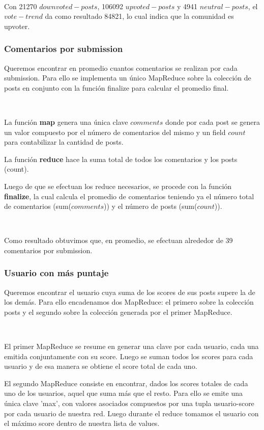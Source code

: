 ~

Con 21270 $downvoted-posts$, 106092 $upvoted-posts$ y 4941 $neutral-posts$, el $vote-trend$ da como resultado 84821, lo cual indica que la comunidad es upvoter.

\subsubsection{Comentarios por submission}

Queremos encontrar en promedio cuantos comentarios se realizan por cada submission. Para ello se implementa un único MapReduce sobre la colección de posts en conjunto con la función finalize para calcular el promedio final.

~

La función \textbf{map} genera una única clave $comments$ donde por cada post se genera un valor compuesto por el número de comentarios del mismo y un field $count$ para contabilizar la cantidad de posts.


La función \textbf{reduce} hace la suma total de todos los comentarios y los posts (count).


Luego de que se efectuan los reduce necesarios, se procede con la función \textbf{finalize}, la cual calcula el promedio de comentarios teniendo ya el número total de comentarios (sum($comments$)) y el número de posts (sum($count$)).

~

Como resultado obtuvimos que, en promedio, se efectuan alrededor de 39 comentarios por submission.

\subsubsection{Usuario con más puntaje}

Queremos encontrar el usuario cuya suma de los scores de sus posts supere la de los demás. Para ello encadenamos dos MapReduce: el primero sobre la colección posts y el segundo sobre la colección generada por el primer MapReduce.

~

El primer MapReduce se resume en generar una clave por cada usuario, cada una emitida conjuntamente con su score. Luego se suman todos los scores para cada usuario y de esa manera se obtiene el score total de cada uno.

El segundo MapReduce consiste en encontrar, dados los scores totales de cada uno de los usuarios, aquel que suma más que el resto. Para ello se emite una única clave 'max', con valores asociados compuestos por una tupla usuario-score por cada usuario de nuestra red. Luego durante el reduce tomamos el usuario con el máximo score dentro de nuestra lista de values. 

